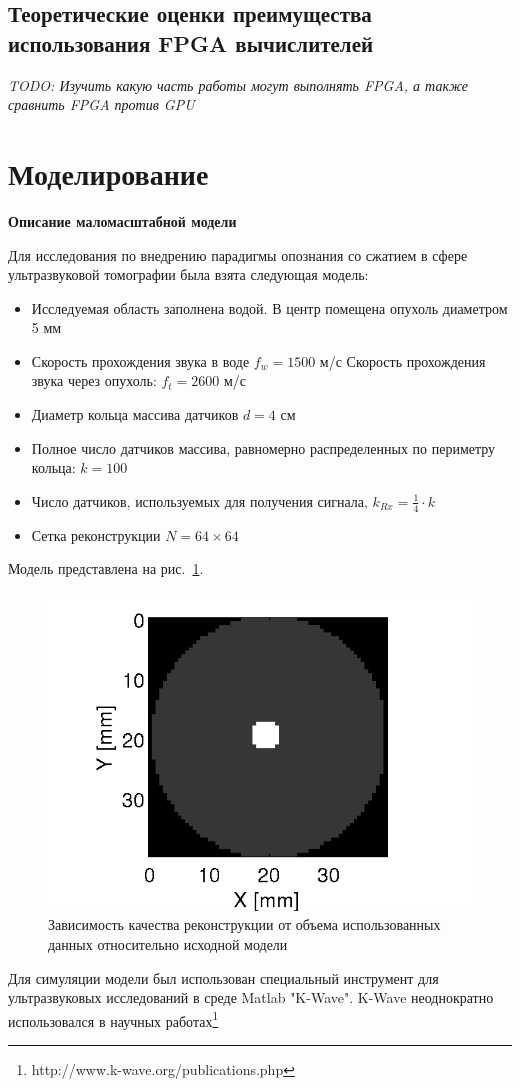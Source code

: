\documentclass[14pt]{matmex-diploma}
\begin{document}
\subsection{Теоретические оценки преимущества использования FPGA вычислителей}
\textit{TODO: Изучить какую часть работы могут выполнять FPGA, а также сравнить FPGA против GPU} \\


\section{Моделирование} \label{sec:modeling}

\textbf{Описание маломасштабной модели} \label{sec:model_desc}

Для исследования по внедрению парадигмы опознания со сжатием в сфере ультразвуковой томографии была взята следующая модель:
\begin{itemize}
\item Исследуемая область заполнена водой. В центр помещена опухоль диаметром 5 мм
\item Скорость прохождения звука в воде $f_w = 1500$ м/с Скорость прохождения звука через опухоль: $f_t = 2600$ м/с
\item Диаметр кольца массива датчиков $d = 4 \text{ см}$
\item Полное число датчиков массива, равномерно распределенных по периметру кольца: $k = 100$
\item Число датчиков, используемых для получения сигнала, $k_{Rx} = \frac{1}{4} \cdot k$
\item Сетка реконструкции $N = 64\times 64$
\end{itemize}
Модель представлена на рис.~\ref{fig:model_1}.

\begin{figure}[h]
\centering
    \includegraphics[width=.4\textwidth]{pics/model.png}
    \caption{Зависимость качества реконструкции от объема использованных данных относительно исходной модели}
    \label{fig:model_1}
\end{figure}

Для симуляции модели был использован специальный инструмент для ультразвуковых исследований в среде Matlab "K-Wave". K-Wave неоднократно использовался в научных работах\footnote{http://www.k-wave.org/publications.php}\cite{treeby2010k} \\
\end{document}
